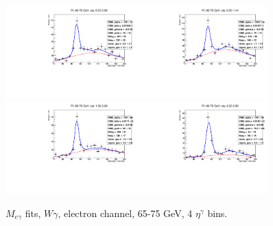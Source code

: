 \begin{figure}[htb]
  \begin{center}
   \includegraphics[width=0.45\textwidth]{../figs/figs_v11/ELECTRON_WGamma/EtoGammaFits/sa_hZmass_h_Data_EtoGamma_Enr_BARREL_pt65to75_ieta0.pdf}\includegraphics[width=0.45\textwidth]{../figs/figs_v11/ELECTRON_WGamma/EtoGammaFits/sa_hZmass_h_Data_EtoGamma_Enr_BARREL_pt65to75_ieta1.pdf}\\
   \includegraphics[width=0.45\textwidth]{../figs/figs_v11/ELECTRON_WGamma/EtoGammaFits/sa_hZmass_h_Data_EtoGamma_Enr_ENDCAP_pt65to75_ieta0.pdf}\includegraphics[width=0.45\textwidth]{../figs/figs_v11/ELECTRON_WGamma/EtoGammaFits/sa_hZmass_h_Data_EtoGamma_Enr_ENDCAP_pt65to75_ieta1.pdf}\\
  \label{fig:etogFits_65to75}
  \caption{$M_{e\gamma}$ fits, $W\gamma$, electron channel, 65-75 GeV, 4 $\eta^{\gamma}$ bins.}
  \end{center}
\end{figure}


